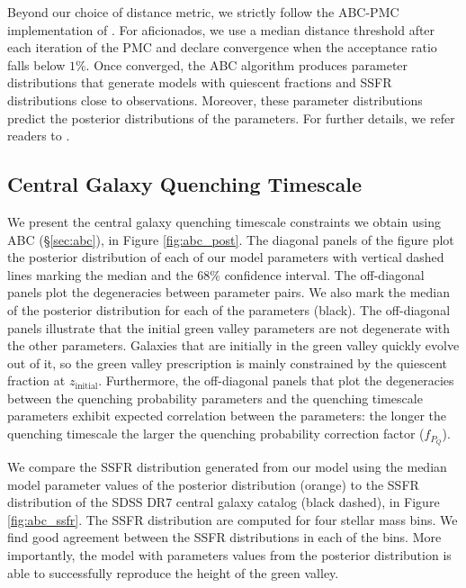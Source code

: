 \documentclass[iop,apj,tighten,twocolappendix,numberedappendix]{emulateapj}
\newcommand{\zinit}{z_\mathrm{initial}}
\begin{document}
Beyond our choice of distance metric, we strictly follow the ABC-PMC 
implementation of \cite{Hahn:2016aa}. For aficionados, we use a median 
distance threshold after each iteration of the PMC and declare 
convergence when the acceptance ratio falls below $1\%$. Once converged, 
the ABC algorithm produces parameter distributions that generate models 
with quiescent fractions and SSFR distributions close to observations. 
Moreover, these parameter distributions predict the posterior distributions 
of the parameters. For further details, we refer readers to \cite{Hahn:2016aa}.

\subsection{Central Galaxy Quenching Timescale} \label{sec:results}
We present the central galaxy quenching timescale constraints 
we obtain using ABC (\S \ref{sec:abc}), in Figure 
\ref{fig:abc_post}. The diagonal panels of the figure plot 
the posterior distribution of each of our model parameters 
with vertical dashed lines marking the median and the $68\%$ 
confidence interval. The off-diagonal panels plot the 
degeneracies between parameter pairs. We also mark the median 
of the posterior distribution for each of the parameters (black). 
The off-diagonal panels illustrate that the initial green valley 
parameters are not degenerate with the other parameters. 
Galaxies that are initially in the green valley quickly 
evolve out of it, so the green valley prescription is mainly 
constrained by the quiescent fraction at $\zinit$. Furthermore, 
the off-diagonal panels that plot the degeneracies between 
the quenching probability parameters and the quenching timescale 
parameters exhibit expected correlation between the parameters: 
the longer the quenching timescale the larger the quenching 
probability correction factor ($f_{P_Q}$). 

We compare the SSFR distribution generated from our model 
using the median model parameter values of the posterior 
distribution (orange) to the SSFR distribution of the SDSS 
DR7 central galaxy catalog (black dashed), in Figure 
\ref{fig:abc_ssfr}. The SSFR distribution are computed for 
four stellar mass bins. We find good agreement between the 
SSFR distributions in each of the bins. More importantly, 
the model with parameters values from the posterior distribution 
is able to successfully reproduce the height of the green valley.
\end{document}
